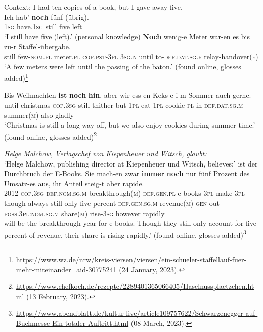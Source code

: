 \begin{exe}
	\ex\label{appendixGermanScalar1}
	 Context: I had ten copies of a book, but I gave away five.\\
	\gll Ich hab' \textbf{noch} fünf \textup{(}übrig\textup{)}. \\
	1\textsc{sg} have.1\textsc{sg} still five \phantom{(}left\\
	\glt \lq I still have five (left).' (personal knowledge)
	\ex\label{appendixGermanScalar2}
	\gll \textbf{Noch} wenig-e Meter war-en es bis zu-r Staffel-übergabe.\\
	still few-\textsc{nom}.\textsc{pl} meter.\textsc{pl} \textsc{cop}.\textsc{pst}-3\textsc{pl} 3\textsc{sg}.\textsc{n} until to-\textsc{def}.\textsc{dat}.\textsc{sg}.\textsc{f} relay-handover(\textsc{f})\\
	\glt \lq A few meters were left until the passing of the baton.\rq{ }(found online, glosses added)\footnote{\url{https://www.wz.de/nrw/kreis-viersen/viersen/ein-schueler-staffellauf-fuer-mehr-miteinander_aid-30775241} (24 January, 2023).}
	
	\ex\label{appendixGermanScalar3}
		\gll Bis Weihnachten \textbf{ist} \textbf{noch} \textbf{hin}, aber wir ess-en Keks-e i-m Sommer auch gerne.\\
	until christmas \textsc{cop}.3\textsc{sg} still thither but 1\textsc{pl} eat-1\textsc{pl} cookie-\textsc{pl} in-\textsc{def}.\textsc{dat}.\textsc{sg}.\textsc{m} summer(\textsc{m}) also gladly\\
	\glt \lq Christmas is still a long way off, but we also enjoy cookies during summer time.\rq{ }(found online, glosses added)\footnote{\url{https://www.chefkoch.de/rezepte/2289401365066405/Haselnussplaetzchen.html} (13 February, 2023).}

	\ex\label{appendixGermanScalar4}
	\textit{Helge Malchow, Verlagschef von Kiepenheuer und Witsch, glaubt:}\\
	\lq Helge Malchow, publishing director at Kiepenheuer und Witsch, believes:\rq
	\exi{} ist der Durchbruch der E-Books. Sie mach-en zwar \textbf{immer} \textbf{noch} nur fünf Prozent des Umsatz-es aus, ihr Anteil steig-t aber rapide.\\
	2012 \textsc{cop}.3\textsc{sg} \textsc{def}.\textsc{nom}.\textsc{sg}.\textsc{m} breakthrough(\textsc{m}) \textsc{def}.\textsc{gen}.\textsc{pl} e-books 3\textsc{pl} make-3\textsc{pl} though always still only five percent \textsc{def}.\textsc{gen}.\textsc{sg}.\textsc{m} revenue(\textsc{m})-\textsc{gen} out \textsc{poss}.3\textsc{pl}:\textsc{nom}.\textsc{sg}.\textsc{m} share(\textsc{m}) rise-3\textsc{sg} however rapidly\\
	 will be the breakthrough year for e-books. Though they still only account for five percent of revenue, their share is rising rapidly.\rq{ }(found online, glosses added)\footnote{\url{https://www.abendblatt.de/kultur-live/article109757622/Schwarzenegger-auf-Buchmesse-Ein-totaler-Auftritt.html} (08 March, 2023).}
	

\end{exe}

